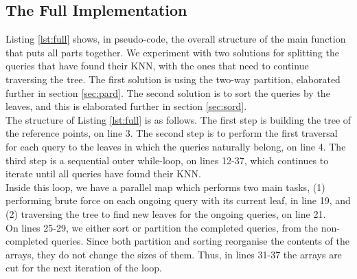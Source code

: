 \subsection{The Full Implementation}
\label{sec:full}




Listing \ref{lst:full} shows, in pseudo-code, the overall structure of the main function that puts all parts together. We experiment with two solutions for splitting the queries that have found their KNN, with the ones that need to continue traversing the tree. The first solution is using the two-way partition, elaborated further in section \ref{sec:pard}. The second solution is to sort the queries by the leaves, and this is elaborated further in section \ref{sec:sord}. 
\\[2mm]
The structure of Listing \ref{lst:full} is as follows. The first step is building the tree of the reference points, on line 3. The second step is to perform the first traversal for each query to the leaves in which the queries naturally belong, on line 4. The third step is a sequential outer while-loop, on lines 12-37, which continues to iterate until all queries have found their KNN. 
\\[2mm]
Inside this loop, we have a parallel map which performs two main tasks, (1) performing brute force on each ongoing query with its current leaf, in line 19, and (2) traversing the tree to find new leaves for the ongoing queries, on line 21. 
\\[2mm]
On lines 25-29, we either sort or partition the completed queries, from the non-completed queries. Since both partition and sorting reorganise the contents of the arrays, they do not change the sizes of them. Thus, in lines 31-37 the arrays are cut for the next iteration of the loop.

